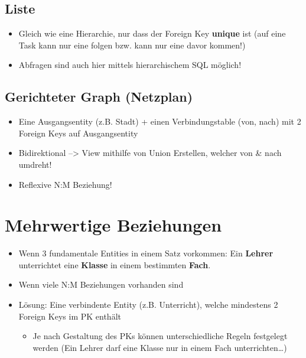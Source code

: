 \subsection{Liste}
\begin{itemize}
    \item Gleich wie eine Hierarchie, nur dass der Foreign Key \textbf{unique} ist (auf eine Task kann nur eine folgen bzw. kann nur eine davor kommen!)
    \item Abfragen sind auch hier mittels hierarchischem SQL möglich!
\end{itemize}

\subsection{Gerichteter Graph (Netzplan)}
\begin{itemize}
    \item Eine Ausgangsentity (z.B. Stadt) + einen Verbindungstable (von, nach) mit 2 Foreign Keys auf Ausgangsentity
    \item Bidirektional --> View mithilfe von Union Erstellen, welcher von \& nach umdreht!
    \item Reflexive N:M Beziehung!
\end{itemize}

\section{Mehrwertige Beziehungen}
\begin{itemize}
    \item Wenn 3 fundamentale Entities in einem Satz vorkommen: Ein \textbf{Lehrer} unterrichtet eine \textbf{Klasse} in einem bestimmten \textbf{Fach}.
    \item Wenn viele N:M Beziehungen vorhanden sind
    \item Lösung: Eine verbindente Entity (z.B. Unterricht), welche mindestens 2 Foreign Keys im PK enthält
    \begin{itemize}
        \item Je nach Gestaltung des PKs können unterschiedliche Regeln festgelegt werden (Ein Lehrer darf eine Klasse nur in einem Fach unterrichten\dots)
    \end{itemize}
\end{itemize}